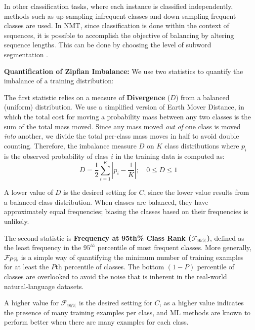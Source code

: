 In other classification tasks, where each instance is classified independently, methods such as up-sampling infrequent classes and down-sampling frequent classes are used.
In NMT, since classification is done within the context of sequences, it is possible to accomplish the objective of balancing by altering sequence lengths.
This can be done by choosing the level of subword segmentation \cite{sennrich-etal-2016-bpe}.

\textbf{Quantification of Zipfian Imbalance:}
We use two statistics to quantify the imbalance of a training distribution:

The first statistic relies on a measure of \textbf{Divergence} ($D$) from a balanced (uniform) distribution.
We use a simplified version of Earth Mover Distance, in which the total cost for moving a probability mass between any two classes  is the sum of the total mass moved.
Since any mass moved \textit{out of} one class is moved \textit{into} another, we divide the total per-class mass moves in half to avoid double counting.
Therefore, the imbalance measure $D$ on $K$ class distributions where $p_i$ is the observed probability of class $i$ in the training data is computed as:
$$D = \frac{1}{2} \sum_{i=1}^{K}| p_i - \frac{1}{K}|; \quad 0 \le D \le 1 $$

A lower value of $D$ is the desired setting for $C$, since the lower value results from a balanced class distribution.
When classes are balanced, they have approximately equal frequencies; biasing the classes based on their frequencies is unlikely.

The second statistic is \textbf{Frequency at 95th\% Class Rank (\textbf{$\mathcal{F}_{95\%}$})}, defined as the least frequency in the $95^{th}$ percentile of most frequent classes.
More generally, $\mathcal{F}_{\large{P\%}}$ is a simple way of quantifying the minimum number of training examples for at least the $P$th percentile of classes.
The bottom $(1-P)$ percentile of classes are overlooked to avoid the noise that is inherent in the real-world natural-language datasets.

A higher value for $\mathcal{F}_{95\%}$ is the desired setting for $C$, as a higher value indicates the presence of many training examples per class, and ML methods are known to perform better when there are many examples for each class.

